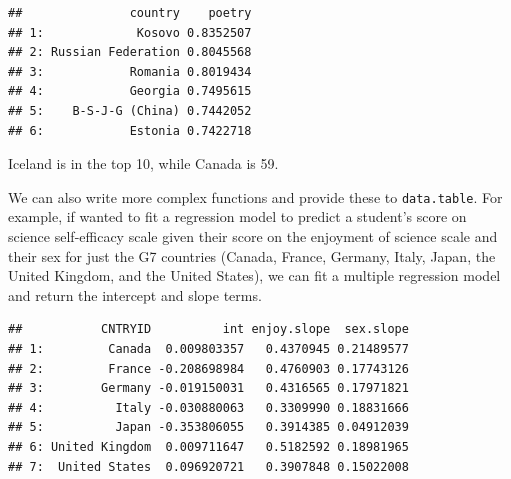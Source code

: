 \documentclass[]{book}
\newenvironment{Shaded}{\begin{snugshade}}{\end{snugshade}}
\newcommand{\ControlFlowTok}[1]{\textcolor[rgb]{0.13,0.29,0.53}{\textbf{#1}}}
\newcommand{\DataTypeTok}[1]{\textcolor[rgb]{0.13,0.29,0.53}{#1}}
\newcommand{\DecValTok}[1]{\textcolor[rgb]{0.00,0.00,0.81}{#1}}
\newcommand{\KeywordTok}[1]{\textcolor[rgb]{0.13,0.29,0.53}{\textbf{#1}}}
\newcommand{\NormalTok}[1]{#1}
\newcommand{\OperatorTok}[1]{\textcolor[rgb]{0.81,0.36,0.00}{\textbf{#1}}}
\newcommand{\StringTok}[1]{\textcolor[rgb]{0.31,0.60,0.02}{#1}}
\begin{document}
\begin{verbatim}
##               country    poetry
## 1:             Kosovo 0.8352507
## 2: Russian Federation 0.8045568
## 3:            Romania 0.8019434
## 4:            Georgia 0.7495615
## 5:    B-S-J-G (China) 0.7442052
## 6:            Estonia 0.7422718
\end{verbatim}

Iceland is in the top 10, while Canada is 59.

We can also write more complex functions and provide these to \texttt{data.table}. For example, if wanted to fit a regression model to predict a student's score on science self-efficacy scale given their score on the enjoyment of science scale and their sex for just the G7 countries (Canada, France, Germany, Italy, Japan, the United Kingdom, and the United States), we can fit a multiple regression model and return the intercept and slope terms.

\begin{Shaded}
\end{Shaded}

\begin{verbatim}
##           CNTRYID          int enjoy.slope  sex.slope
## 1:         Canada  0.009803357   0.4370945 0.21489577
## 2:         France -0.208698984   0.4760903 0.17743126
## 3:        Germany -0.019150031   0.4316565 0.17971821
## 4:          Italy -0.030880063   0.3309990 0.18831666
## 5:          Japan -0.353806055   0.3914385 0.04912039
## 6: United Kingdom  0.009711647   0.5182592 0.18981965
## 7:  United States  0.096920721   0.3907848 0.15022008
\end{verbatim}
\end{document}
